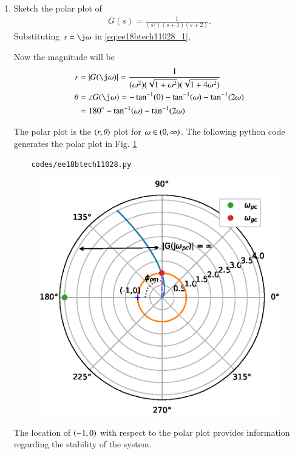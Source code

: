\begin{enumerate}[label=\thesubsection.\arabic*.,ref=\thesubsection.\theenumi]
\item Sketch the polar plot of 
\begin{align}
    G(s) = \frac{1}{(s^2)(s+1)(s+2)}. 
    \label{eq:ee18btech11028_1}
\end{align}
%
\solution
Substituting $s = \j\omega$ in      \eqref{eq:ee18btech11028_1},

Now the magnitude will be
\begin{align}
   r &=  |G(\j\omega)| = \frac{1}{(\omega^2)(\sqrt{1 + \omega^2})(\sqrt{1+4\omega^2})}
    \label{eq:ee18btech11028_2}
\\
\theta &=\angle G(\j\omega)  = - \tan^{-1}(0) - \tan^{-1}(\omega) - \tan^{-1}(2\omega)
\\
     &= 180\degree - \tan^{-1}(\omega) - \tan^{-1}(2\omega)
    \label{eq:ee18btech11028_3}
\end{align}

The polar plot is the $\left(r,\theta\right)$ plot for $\omega \in \left(0,\infty\right)$.
The following python code generates  the polar plot in Fig. \ref{fig:ee18btech11028_fig1}
\begin{lstlisting}
    codes/ee18btech11028.py
\end{lstlisting}
\begin{figure}[!h]
\centering
    \includegraphics[width=\columnwidth]{./figs/ee18btech11028.eps}
  \caption{}
  \label{fig:ee18btech11028_fig1}
\end{figure}
The location of $\left(-1,0\right)$ with respect to the polar plot provides information regarding the stability of the system.  
\begin{itemize}
    

\end{itemize}
\end{enumerate}
